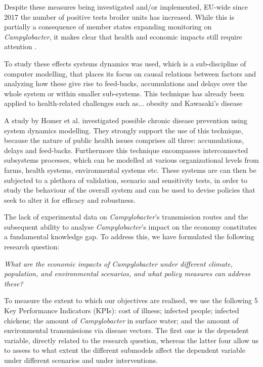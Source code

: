 Despite these measures being investigated and/or implemented, EU-wide since 2017 the number of positive tests broiler units has increased. While this is partially a consequence of member states expanding monitoring on \textit{Campylobacter}, it makes clear that health and economic impacts still require attention \parencite{nastasijevic_european_2020}.

To study these effects systems dynamics was used, which is a sub-discipline of computer modelling, that places its focus on causal relations between factors and analyzing how these give rise to feed-backs, accumulations and delays over the whole system or within smaller sub-systems. This technique has already been applied to health-related challenges such as...
obesity and Kawasaki's disease

A study by Homer et al. investigated possible chronic disease prevention using system dynamics modelling. They strongly support the use of this technique, because the nature of public health issues comprises all three: accumulations, delays and feed-backs\parencite{homer_system_2006}. Furthermore this technique encompasses interconnected subsystems processes, which can be modelled at various organizational levels from farms, health systems, environmental systems etc. These systems are can then be subjected to a plethora of validation, scenario and sensitivity tests, in order to study the behaviour of the overall system and can be used to devise policies that seek to alter it for efficacy and robustness. 


The lack of experimental data on \textit{Campylobacter}’s transmission routes and the subsequent ability to analyse \textit{Campylobacter}’s impact on the economy constitutes a fundamental knowledge gap. To address this, we have formulated the following research question:
\begin{center}\textit{\textcolor{NiceBlue}{
What are the economic impacts of Campylobacter under different climate, population, and environmental scenarios, and what policy measures can address these? 
}}
\end{center}
To measure the extent to which our objectives are realised, we use the following 5 Key Performance Indicators (KPIs): cost of illness; infected people; infected chickens; the amount of \textit{Campylobacter} in surface water; and the amount of environmental transmissions via disease vectors. The first one is the dependent variable, directly related to the research question, whereas the latter four allow us to assess to what extent the different submodels affect the dependent variable under different scenarios and under interventions.

